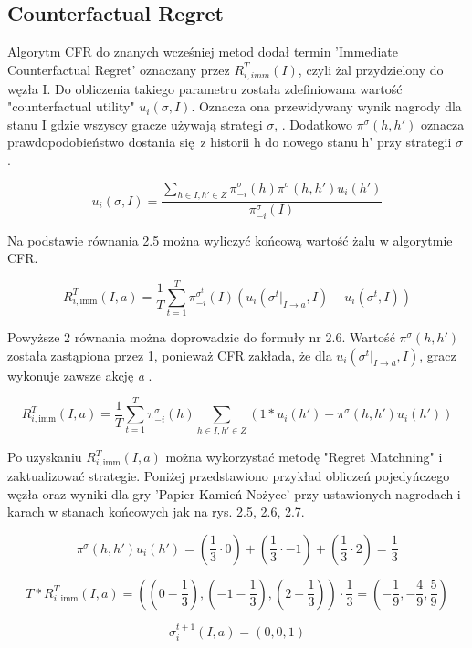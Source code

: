 \documentclass[12pt,oneside,a4paper]{report}
\begin{document}
\subsection{Counterfactual Regret}

Algorytm CFR do znanych wcześniej metod dodał termin 'Immediate Counterfactual Regret' oznaczany przez $R^{T}_{i,
imm} (I)$, 
czyli żal przydzielony do węzła I.
Do obliczenia takiego parametru została zdefiniowana wartość "counterfactual utility" $u_{i}(\sigma,
I)$. Oznacza ona przewidywany wynik nagrody dla stanu I gdzie wszyscy gracze używają strategi
$\sigma$, \cite{CFR}. Dodatkowo $\pi^{\sigma} (h, h')$ oznacza prawdopodobieństwo dostania się z historii h do 
nowego stanu h' przy strategii $\sigma$ \cite{CFR}.

\begin{equation}
   u_{i} (\sigma, I) = \frac{\sum_{h \in I, h' \in Z} \pi^{\sigma}_{-i} (h) \pi^{\sigma} (h,
   h') u_{i}(h')}{\pi_{-i}^{\sigma}(I)}
\end{equation}

Na podstawie równania 2.5 można wyliczyć końcową wartość żalu w algorytmie CFR.

\begin{equation}
   R^{T}_{i,\text{imm}} (I, a) = \frac{1}{T} \sum^{T}_{t=1} \pi^{\sigma^{t}}_{-i} (I)
   (u_{i}(\sigma^{t}|_{I \rightarrow a}, I) - u_{i}(\sigma^{t}, I))
\end{equation}


Powyższe 2 równania można doprowadzic do formuły nr 2.6. Wartość $\pi^{\sigma} (h,h')$ została
zastąpiona przez 1, ponieważ
CFR zakłada, że dla $u_{i}(\sigma^{t}|_{I \rightarrow a}, I)$, gracz wykonuje zawsze akcję \emph{a} \cite{CFR}.



\begin{equation}
   R^{T}_{i,\text{imm}} (I, a) = \frac{1}{T} \sum^{T}_{t=1}
   \pi_{-i}^{\sigma}(h)\sum_{h \in I, h' \in Z}(1*u_{i}(h') - \pi^{\sigma}(h,h')u_{i}(h'))
\end{equation}


\vspace{0.5cm}
Po uzyskaniu $R^{T}_{i,\text{imm}} (I, a)$ można wykorzystać metodę "Regret Matchning" i
zaktualizować strategie.
Poniżej przedstawiono przykład obliczeń pojedyńczego węzła oraz wyniki 
dla gry 'Papier-Kamień-Nożyce' przy ustawionych
nagrodach i karach w stanach końcowych jak na rys. 2.5, 2.6, 2.7.

\begin{center}
$$
   \pi^{\sigma}(h,h')u_{i}(h') =  (\frac{1}{3} \cdot 0) + (\frac{1}{3} \cdot -1) +
   (\frac{1}{3} \cdot 2) = \frac{1}{3}
$$

$$
T*R^{T}_{i,\text{imm}} (I, a) =
((0-\frac{1}{3}), (-1-\frac{1}{3}), (2-\frac{1}{3})) \cdot \frac{1}{3}= (-\frac{1}{9},
-\frac{4}{9}, \frac{5}{9}) 
$$

$$
\sigma^{t+1}_{i}\left(I, a \right) = (0, 0, 1)
$$
\end{center}
\vspace{0.5cm}
\end{document}
